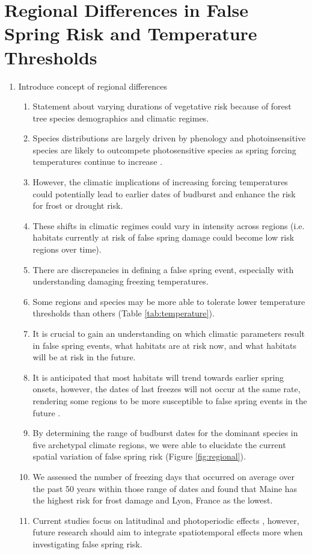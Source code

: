 \documentclass{article}\usepackage[]{graphicx}\usepackage[]{color}
\begin{document}
\section*{Regional Differences in False Spring Risk and Temperature Thresholds}
\begin{enumerate}
\item Introduce concept of regional differences
\begin {enumerate}
\item Statement about varying durations of vegetative risk because of forest tree species demographics and climatic regimes.
\item Species distributions are largely driven by phenology \citep{Chuine2001} and photoinsensitive species are likely to outcompete photosensitive species as spring forcing temperatures continue to increase \cite{Vitasse2011,Gauzere2017}.
\item However, the climatic implications of increasing forcing temperatures could potentially lead to earlier dates of budburst and enhance the risk for frost or drought risk. 
\item These shifts in climatic regimes could vary in intensity across regions (i.e. habitats currently at risk of false spring damage could become low risk regions over time). 
\item There are discrepancies in defining a false spring event, especially with understanding damaging freezing temperatures.
\item Some regions and species may be more able to tolerate lower temperature thresholds than others (Table \ref{tab:temperature}).
\item It is crucial to gain an understanding on which climatic parameters result in false spring events, what habitats are at risk now, and what habitats will be at risk in the future. 
\item It is anticipated that most habitats will trend towards earlier spring onsets, however, the dates of last freezes will not occur at the same rate, rendering some regions to be more susceptible to false spring events in the future \citep{Labe2016}.
\item By determining the range of budburst dates for the dominant species in five archetypal climate regions, we were able to elucidate the current spatial variation of false spring risk (Figure \ref{fig:regional}).
\item We assessed the number of freezing days \citep{Schwartz1993} that occurred on average over the past 50 years within those range of dates and found that Maine has the highest risk for frost damage and Lyon, France as the lowest. 
\item Current studies focus on latitudinal and photoperiodic effects \citep{Partanen2004, Viheraaarnio2006, Caffarra2011, Gauzere2017}, however, future research should aim to integrate spatiotemporal effects more when investigating false spring risk.
\end {enumerate}
\end{enumerate}
\end{document}
